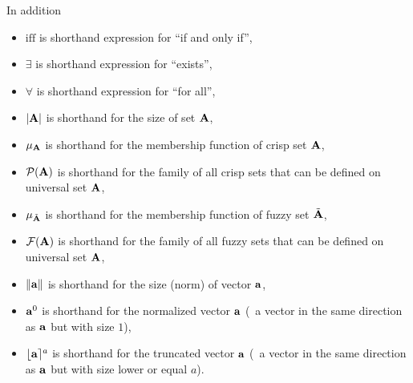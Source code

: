 \noindent In addition
\begin{itemize}
\item $\mathrm{iff}$ is shorthand expression for ``if and only if'',
\item $\exists$ is shorthand expression for ``exists'',
\item $\forall$ is shorthand expression for ``for all'',
\item $\left|{\mathbf{A}}\right|$ is shorthand for the size of set ${\mathbf{A}}$,
\item $\mu_{\mathbf{A}}$ is shorthand for the membership function of crisp set ${\mathbf{A}}$,
\item ${\mathcal{P}({\mathbf{A}})}$ is shorthand for the family of all crisp sets that can be defined on universal set ${\mathbf{A}}$, 
\item $\mu_{\tilde{{\mathbf{A}}}}$ is shorthand for the membership function of fuzzy set ${\tilde{{\mathbf{A}}}}$,
\item ${\mathcal{F}({\mathbf{A}})}$ is shorthand for the family of all fuzzy sets that can be defined on universal set ${\mathbf{A}}$, 
\item $\left\|{\mathbf{a}}\right\|$ is shorthand for the size (norm) of vector ${\mathbf{a}}$,
\item ${\mathbf{a}}^0$ is shorthand for the normalized vector ${\mathbf{a}}$ (\ie\ a vector in the same direction as ${\mathbf{a}}$ but with size $1$),
\item $\lfloor{\ensuremath{\mathbf{a}}}\rceil^a$ is shorthand for the truncated vector ${\mathbf{a}}$ (\ie\ a vector in the same direction as ${\mathbf{a}}$ but with size lower or equal $a$).
\end{itemize}
